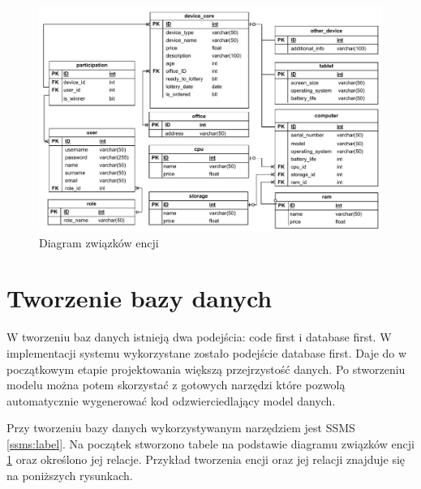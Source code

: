 \begin{figure}[h]
    \includegraphics[width=\linewidth]{rys04/ER_Diagram.pdf}
    \caption{Diagram związków encji}
    \label{ErDiagram_etykieta}
\end{figure}

\section{Tworzenie bazy danych}
W tworzeniu baz danych istnieją dwa podejścia: code first i database first. W implementacji systemu wykorzystane zostało podejście database first. Daje do w początkowym etapie projektowania większą przejrzystość danych. Po stworzeniu modelu można potem skorzystać z gotowych narzędzi które pozwolą automatycznie wygenerować kod odzwierciedlający model danych.

Przy tworzeniu bazy danych wykorzystywanym narzędziem jest SSMS \ref{ssms:label}. 
Na początek stworzono tabele na podstawie diagramu związków encji \ref{ErDiagram_etykieta} oraz określono jej relacje. Przykład tworzenia encji oraz jej relacji znajduje się na poniższych rysunkach.


